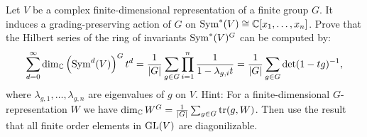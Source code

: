 \documentclass[11pt, a4paper]{article}
\begin{document}
\begin{exercise}
  Let $V$ be a complex finite-dimensional representation of a finite group $G$.
  It induces a grading-preserving action of $G$ on $\operatorname{Sym}^*(V) \cong \mathbb{C}[x_1,\dots,x_n]$.
  Prove that the Hilbert series of the ring of invariants $\operatorname{Sym}^*(V)^G$ can be
  computed by:
  \[
    \sum_{d=0}^{\infty} \dim_{\C} \del{\Sym^d(V)}^G t^d =
    \frac{1}{|G|} \sum_{g \in G} \prod_{i=1}^{n} \frac{1}{1 - \lambda_{g,i} t} =
    \frac{1}{|G|} \sum_{g \in G} \det(1 - t g)^{-1},
  \]
  where $\lambda_{g,1},\dots,\lambda_{g,n}$ are eigenvalues of $g$ on $V$.
  Hint: For a finite-dimensional $G$-representation $W$ we have
  $\dim_{\mathbb{C}} W^G = \frac{1}{|G|} \sum_{g \in G} \operatorname{tr}(g,W)$.
  Then use the result that all finite order elements in $\mathrm{GL}(V)$
  are diagonilizable.
\end{exercise}
\end{document}
